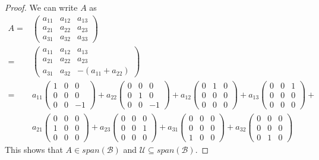 \documentclass{article}
\begin{document}
\begin{proof}
We can write $A$ as 
\begin{align*}
A =& \begin{pmatrix} a_{11}&a_{12}&a_{13}\\a_{21}&a_{22}&a_{23}\\a_{31}&a_{32}&a_{33}\end{pmatrix} \\
=&\begin{pmatrix} a_{11}&a_{12}&a_{13}\\a_{21}&a_{22}&a_{23}\\a_{31}&a_{32}&-(a_{11}+a_{22})\end{pmatrix} \\
=& a_{11}\begin{pmatrix} 1&0&0\\0&0&0\\0&0&-1 \end{pmatrix} + a_{22} \begin{pmatrix} 0&0&0\\0&1&0\\0&0&-1 \end{pmatrix}+  a_{12}\begin{pmatrix} 0&1&0\\0&0&0\\0&0&0 \end{pmatrix}+a_{13} \begin{pmatrix} 0&0&1\\0&0&0\\0&0&0 \end{pmatrix}+ \\
&a_{21}\begin{pmatrix} 0&0&0\\1&0&0\\0&0&0 \end{pmatrix}+a_{23} \begin{pmatrix} 0&0&0\\0&0&1\\0&0&0 \end{pmatrix}+a_{31} \begin{pmatrix} 0&0&0\\0&0&0\\1&0&0 \end{pmatrix}+a_{32} \begin{pmatrix} 0&0&0\\0&0&0\\0&1&0 \end{pmatrix}
\end{align*}
This shows that $A \in span(\mathcal{B})$ and $\mathcal{U} \subseteq span(\mathcal{B})$.
\smallskip


\end{proof}
\end{document}
